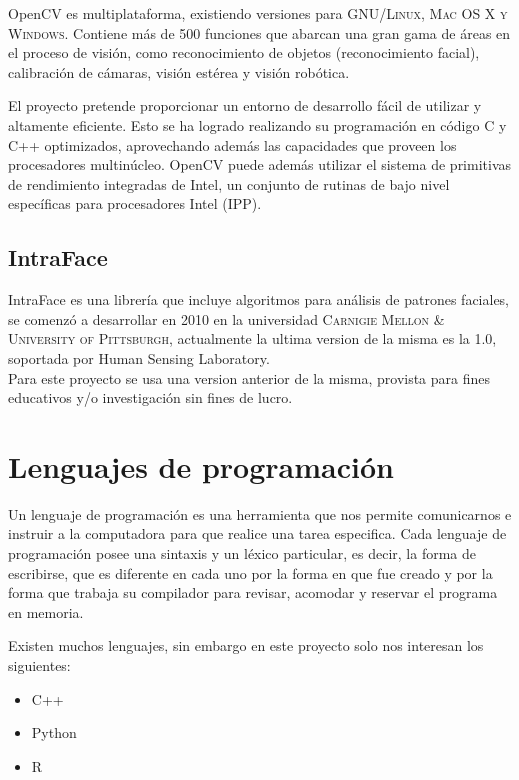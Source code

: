 \documentclass[12pt]{book} %
\begin{document}
		OpenCV es multiplataforma, existiendo versiones para \textsc{GNU/Linux, Mac OS X y Windows}. Contiene más de 500 funciones 
		que abarcan una gran gama de áreas en el proceso de visión, como reconocimiento de objetos (reconocimiento facial), 
		calibración de cámaras, visión estérea y visión robótica.
		
		El proyecto pretende proporcionar un entorno de desarrollo fácil de utilizar y altamente eficiente. Esto se ha logrado
		realizando su programación en código C y C++ optimizados, aprovechando además las capacidades que proveen los procesadores
		multinúcleo. OpenCV puede además utilizar el sistema de primitivas de rendimiento integradas de Intel, un conjunto de 
		rutinas de bajo nivel específicas para procesadores Intel \textsc{(IPP)}.
		
		
	\subsection{IntraFace}
		IntraFace es una librería que incluye algoritmos para análisis de patrones faciales, se comenzó a desarrollar en 2010 en la
		universidad \textsc{Carnigie Mellon \& University of Pittsburgh}, actualmente la ultima version de la misma es la 1.0, soportada 
		por Human Sensing Laboratory.\\
		Para este proyecto se usa una version anterior de la misma, provista para fines educativos y/o investigación sin fines de lucro.

	
		
\newpage		
	
\section{Lenguajes de programación}
	
	Un lenguaje de programación es una herramienta que nos permite comunicarnos e instruir a la computadora para que realice una tarea
	especifica. Cada lenguaje de programación posee una sintaxis y un léxico particular, es decir, la forma de escribirse, que es 
	diferente en cada uno por la forma en que fue creado y por la forma que trabaja su compilador para revisar, acomodar y reservar el
	programa en memoria.
	
	Existen muchos lenguajes, sin embargo en este proyecto solo nos interesan los siguientes:
	\begin{multicols}{3}	
		\begin{itemize}
			\item C++
			\item Python
			\item R		
		\end{itemize}
	\end{multicols}
	
\end{document}
